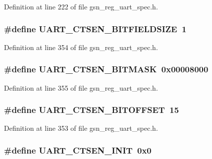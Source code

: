 Definition at line 222 of file gsn\_\-reg\_\-uart\_\-spec.h.

\hypertarget{a00575_afea3d11b5805bbc57521b70205ffb6a3}{
\subsubsection[{UART\_\-CTSEN\_\-BITFIELDSIZE}]{\setlength{\rightskip}{0pt plus 5cm}\#define UART\_\-CTSEN\_\-BITFIELDSIZE~1}}
\label{a00575_afea3d11b5805bbc57521b70205ffb6a3}


Definition at line 354 of file gsn\_\-reg\_\-uart\_\-spec.h.

\hypertarget{a00575_ac4f1d4cf659e4cbbbca323a3029efae7}{
\subsubsection[{UART\_\-CTSEN\_\-BITMASK}]{\setlength{\rightskip}{0pt plus 5cm}\#define UART\_\-CTSEN\_\-BITMASK~0x00008000}}
\label{a00575_ac4f1d4cf659e4cbbbca323a3029efae7}


Definition at line 355 of file gsn\_\-reg\_\-uart\_\-spec.h.

\hypertarget{a00575_ae1dd175958a218bc7de5d9ca9a9c442d}{
\subsubsection[{UART\_\-CTSEN\_\-BITOFFSET}]{\setlength{\rightskip}{0pt plus 5cm}\#define UART\_\-CTSEN\_\-BITOFFSET~15}}
\label{a00575_ae1dd175958a218bc7de5d9ca9a9c442d}


Definition at line 353 of file gsn\_\-reg\_\-uart\_\-spec.h.

\hypertarget{a00575_aab6477e289a2642880ba87faed6e8cb5}{
\subsubsection[{UART\_\-CTSEN\_\-INIT}]{\setlength{\rightskip}{0pt plus 5cm}\#define UART\_\-CTSEN\_\-INIT~0x0}}
\label{a00575_aab6477e289a2642880ba87faed6e8cb5}



